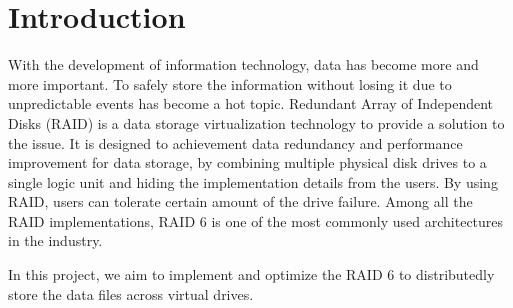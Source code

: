 \section{Introduction}

With the development of information technology, data has become more and more important. To safely store the information without losing it due to unpredictable events has become a hot topic. Redundant Array of Independent Disks (RAID) is a data storage virtualization technology to provide a solution to the issue. It is designed to achievement data redundancy and performance improvement for data storage, by combining multiple physical disk drives to a single logic unit and hiding the implementation details from the users. By using RAID, users can tolerate certain amount of the drive failure. Among all the RAID implementations, RAID 6 is one of the most commonly used architectures in the industry. 
 
In this project, we aim to implement and optimize the RAID 6 to distributedly store the data files across virtual drives.
